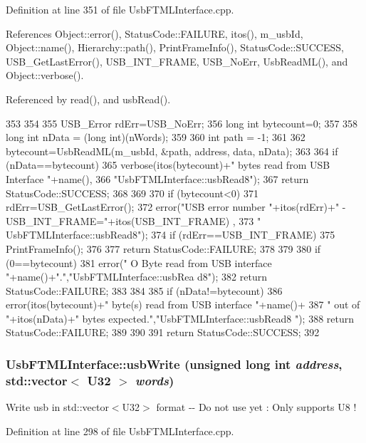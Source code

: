 Definition at line 351 of file UsbFTMLInterface.cpp.

References Object::error(), StatusCode::FAILURE, itos(), m\_\-usbId, Object::name(), Hierarchy::path(), PrintFrameInfo(), StatusCode::SUCCESS, USB\_\-GetLastError(), USB\_\-INT\_\-FRAME, USB\_\-NoErr, UsbReadML(), and Object::verbose().

Referenced by read(), and usbRead().


\begin{DoxyCode}
353                                                              {
354   
355   USB_Error rdErr=USB_NoErr;
356   long int bytecount=0;
357 
358   long int nData = (long int)(nWords);
359 
360   int path = -1;
361   
362   bytecount=UsbReadML(m_usbId, &path, address, data, nData);
363 
364   if (nData==bytecount){
365     verbose(itos(bytecount)+" bytes read from USB Interface "+name(),
366             "UsbFTMLInterface::usbRead8");
367     return StatusCode::SUCCESS;
368   }
369 
370   if (bytecount<0){
371     rdErr=USB_GetLastError();
372     error("USB error number "+itos(rdErr)+" - USB_INT_FRAME="+itos(USB_INT_FRAME)
      ,
373             " UsbFTMLInterface::usbRead8");
374     if (rdErr==USB_INT_FRAME){
375       PrintFrameInfo();
376     } 
377     return StatusCode::FAILURE;
378   }
379   
380   if (0==bytecount){
381     error(" O Byte read from USB interface "+name()+".","UsbFTMLInterface::usbRea
      d8");
382     return StatusCode::FAILURE;
383   }
384 
385   if (nData!=bytecount){
386     error(itos(bytecount)+" byte(s) read from USB interface "+name()+
387             " out of "+itos(nData)+" bytes expected.","UsbFTMLInterface::usbRead8
      ");
388     return StatusCode::FAILURE;    
389   }
390 
391   return StatusCode::SUCCESS;
392 }
\end{DoxyCode}
\hypertarget{classUsbFTMLInterface_a24eed1c8e7ba38e8a997aeff8b0e0a51}{
\subsubsection[{usbWrite}]{ UsbFTMLInterface::usbWrite (unsigned long int {\em address}, \/  std::vector$<$ {\bf U32} $>$ {\em words})}}
\label{classUsbFTMLInterface_a24eed1c8e7ba38e8a997aeff8b0e0a51}
Write usb in std::vector$<$U32$>$ format -\/-\/ Do not use yet : Only supports U8 ! 

Definition at line 298 of file UsbFTMLInterface.cpp.

